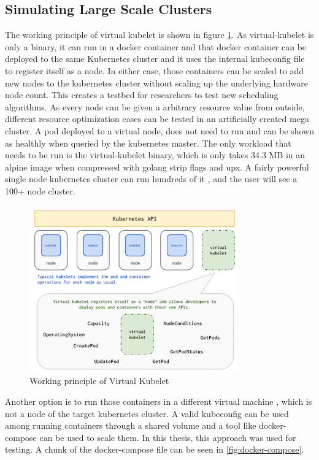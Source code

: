 \subsection{Simulating Large Scale Clusters}
The working principle of virtual kubelet is shown in figure \ref{fig:vk}. As virtual-kubelet is only a binary, it can run in a docker container and that docker container can be deployed to the same Kubernetes cluster and it uses the internal kubeconfig file to register itself as a node. In either case, those containers can be scaled to add new nodes to the kubernetes cluster without scaling up the underlying hardware node count. This creates a testbed for researchers to test new scheduling algorithms. As every node can be given a arbitrary resource value from outside, different resource optimization cases can be tested in an artificially created mega cluster. A pod deployed to a virtual node, does not need to run and can be shown as healthly when queried by the kubernetes master. The only workload that needs to be run is the virtual-kubelet binary, which is only takes 34.3 MB in an alpine image when compressed with golang strip flags and upx. A fairly powerful single node kubernetes cluster can run hundreds of it , and the user will see a 100+ node cluster.

\begin{figure}[htpb]
  \centering
  \includegraphics[width=0.8\textwidth]{figures/vk.png}
  \caption{Working principle of Virtual Kubelet \cite{virtual}} \label{fig:vk}
\end{figure}

Another option is to run those containers in a different virtual machine , which is not a node of the target kubernetes cluster. A valid kubeconfig can be used among running containers through a shared volume and a tool like docker-compose can be used to scale them. In this thesis, this approach was used for testing. A chunk of the docker-compose file can be seen in \ref{fig:docker-compose}.

